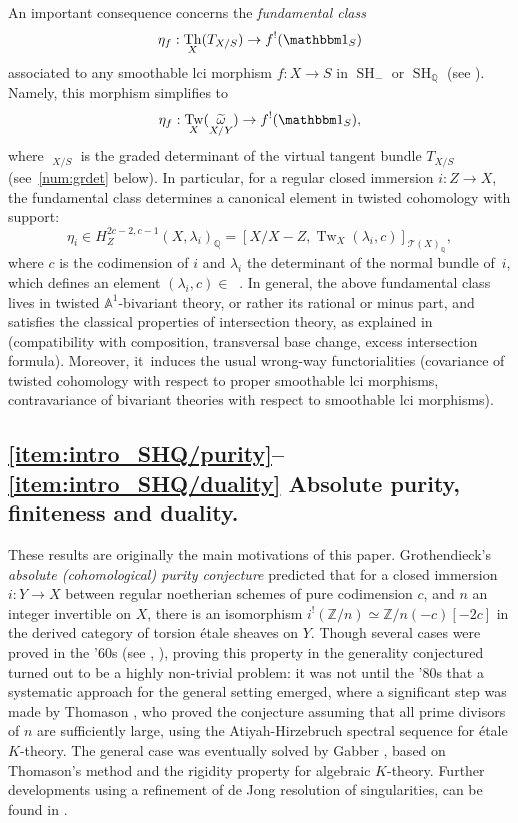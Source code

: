 \documentclass[JEP,XML,SOM,Unicode]{cedram}
\newcommand{\T}{\mathscr T}
\DeclareMathOperator{\uPic}{\underline{Pic}}
\renewcommand{\AA}{\mathbb A}
\newcommand{\un}{\mathbbm 1}
\DeclareMathOperator{\SH}{SH}
\DeclareMathOperator{\Th}{Th}
\DeclareMathOperator{\Tw}{Tw}
\DeclareMathOperator{\tomega}{\widetilde \omega}
\newcommand{\QQ} {\mathbb Q}
\theoremstyle{remark}
\theoremstyle{definition}
\numberwithin{equation}{thm}
\begin{document}
An important consequence concerns the \emph{fundamental class}
\[
\eta_f : \Th_X(T_{X/S}) \to f^!(\un_S)
\]
associated to any smoothable lci morphism $f : X \to S$ in $\SH_-$ or $\SH_\QQ$ (see \cite[4.3.4]{DJK}).
Namely, this morphism simplifies to
\[
\eta_f : \Tw_X(\tomega_{X/Y}) \to f^!(\un_S),
\]
where $\tomega_{X/S}$ is the graded determinant of the virtual tangent bundle $T_{X/S}$ (see~\ref{num:grdet} below).
In particular, for a regular closed immersion $i : Z \to X$, the fundamental class determines a canonical element in twisted cohomology with support:
\[
\eta_i
\in H^{2c-2,c-1}_Z(X,\lambda_i)_\QQ
= [X/X-Z,\Tw_X(\lambda_i,c)]_{\T(X)_\QQ},
\]
where $c$ is the codimension of $i$ and $\lambda_i$ the determinant of the normal bundle of~$i$, which defines an element $(\lambda_i,c)\in \uPic$. In general, the above fundamental class lives in twisted $\AA^1$-bivariant theory, or rather its rational or minus part, and satisfies the classical properties of intersection theory, as explained in \cite{DJK} (compatibility with composition, transversal base change, excess intersection formula).
Moreover, it~induces the usual wrong-way functorialities (covariance of twisted cohomology with respect to proper smoothable lci morphisms, contravariance of bivariant theories with respect to smoothable lci morphisms).

\subsection*{\eqref{item:intro_SHQ/purity}--\eqref{item:intro_SHQ/duality} Absolute purity, finiteness and duality.}
These results are originally the main motivations of this paper.
Grothendieck's \emph{absolute (cohomological) purity conjecture} \cite[I\,3.1.4]{SGA5} predicted that for a closed immersion $i:Y\to X$ between regular noetherian schemes of pure codimension $c$, and $n$ an integer invertible on $X$, there is an isomorphism $i^!(\mathbb{Z}/n)\simeq \mathbb{Z}/n(-c)[-2c]$ in the derived category of torsion étale sheaves on $Y$.
Though several cases were proved in the '60s (see \cite[I\,5.1]{SGA5}, \cite[XVIII\,3.2.5]{SGA4}), proving this property in the generality conjectured turned out to be a highly non-trivial problem: it was not until the '80s that a systematic approach for the general setting emerged, where a significant step was made by Thomason \cite{Thomason1}, who proved the conjecture assuming that all prime divisors of $n$ are sufficiently large, using the Atiyah-Hirzebruch spectral sequence for étale $K$-theory.
The general case was eventually solved by Gabber \cite{Fuji}, based on Thomason's method and the rigidity property for algebraic $K$-theory.
Further developments using a refinement of de Jong resolution of singularities, can be found in \cite[Exp.\,XVI]{Gabber}.
\end{document}
